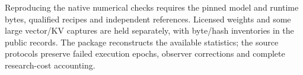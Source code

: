 Reproducing the native numerical checks requires the pinned model and runtime bytes, qualified recipes and independent references. Licensed weights and some large vector/KV captures are held separately, with byte/hash inventories in the public records. The package reconstructs the available statistics; the source protocols preserve failed execution epochs, observer corrections and complete research-cost accounting.
